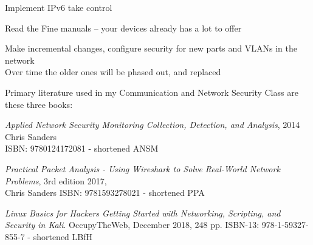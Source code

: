 \documentclass[Screen16to9,17pt]{foils}
\begin{document}


\begin{list2}
\item Implement IPv6 take control
\item Read the Fine manuals -- your devices already has a lot to offer
\item Make incremental changes, configure security for new parts and VLANs in the network\\
Over time the older ones will be phased out, and replaced
\end{list2}

\myquestionspage


Primary literature used in my Communication and Network Security Class
are these three books:
\begin{list2}
\item \emph{Applied Network Security Monitoring Collection, Detection, and Analysis}, 2014 Chris Sanders \\
ISBN: 9780124172081 - shortened ANSM
\item \emph{Practical Packet Analysis - Using Wireshark to Solve Real-World Network Problems}, 3rd edition 2017, \\
Chris Sanders ISBN: 9781593278021 - shortened PPA
\item \emph{Linux Basics for Hackers Getting Started with Networking, Scripting, and Security in Kali}. OccupyTheWeb, December 2018, 248 pp. ISBN-13: 978-1-59327-855-7 - shortened LBfH
\end{list2}
\end{document}
